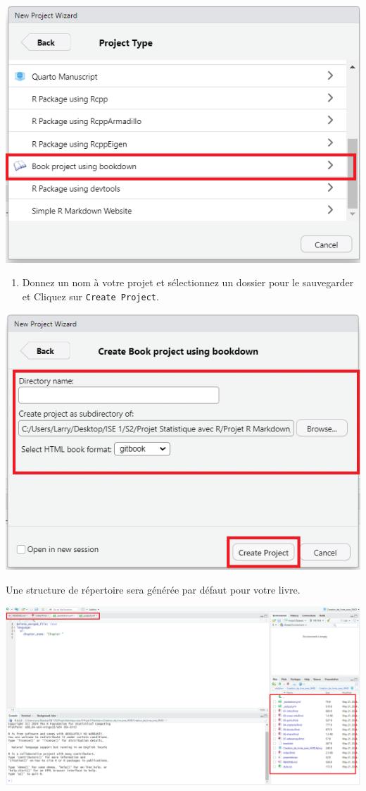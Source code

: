 \documentclass[
  12pt,
]{article}
\providecommand{\tightlist}{%
  \setlength{\itemsep}{0pt}\setlength{\parskip}{0pt}}
\begin{document}
\begin{center}\includegraphics[width=0.7\linewidth,height=0.7\textheight]{../Document_Rmarkdown/Images_creation_livres/book_using_bookdown} \end{center}

\begin{enumerate}
\def\labelenumi{\arabic{enumi}.}
\setcounter{enumi}{3}
\tightlist
\item
  Donnez un nom à votre projet et sélectionnez un dossier pour le
  sauvegarder et Cliquez sur \texttt{Create\ Project}.
\end{enumerate}

\begin{center}\includegraphics[width=0.7\linewidth,height=0.7\textheight]{../Document_Rmarkdown/Images_creation_livres/Create_projet} \end{center}

Une structure de répertoire sera générée par défaut pour votre livre.

\begin{center}\includegraphics[width=1\linewidth,height=1\textheight]{../Document_Rmarkdown/Images_creation_livres/Affichage_Projet} \end{center}
\end{document}
